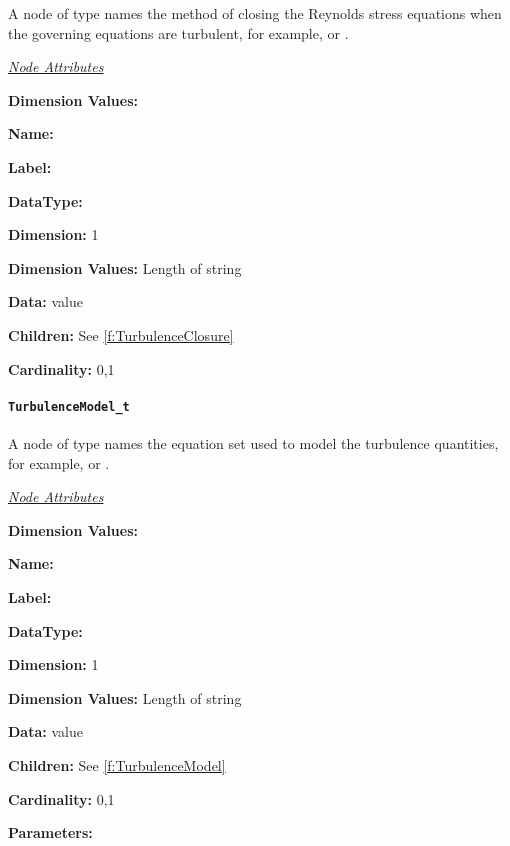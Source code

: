 \enlargethispage{\baselineskip}%
A node of type  names the method of closing
the Reynolds stress equations when the governing equations are
turbulent, for example,  or
.

\textit{\uline{Node Attributes}}
\begin{Ventryic}{\textbf{Dimension Values:}}
\item [\textbf{Name:}]
\item [\textbf{Label:}]
\item [\textbf{DataType:}]
\item [\textbf{Dimension:}]
      1
\item [\textbf{Dimension Values:}]
      Length of string
\item [\textbf{Data:}]
       value
\item [\textbf{Children:}]
      See \autoref{f:TurbulenceClosure}
\item [\textbf{Cardinality:}]
      0,1
\end{Ventryic}

\paragraph{\texttt{TurbulenceModel\_t}}

A node of type  names the equation
set used to model the turbulence quantities, for example,
 or .

\textit{\uline{Node Attributes}}
\begin{Ventryic}{\textbf{Dimension Values:}}
\item [\textbf{Name:}]
\item [\textbf{Label:}]
\item [\textbf{DataType:}]
\item [\textbf{Dimension:}]
      1
\item [\textbf{Dimension Values:}]
      Length of string
\item [\textbf{Data:}]
       value
\item [\textbf{Children:}]
      See \autoref{f:TurbulenceModel}
\item [\textbf{Cardinality:}]
      0,1
\item [\textbf{Parameters:}]
\end{Ventryic}


